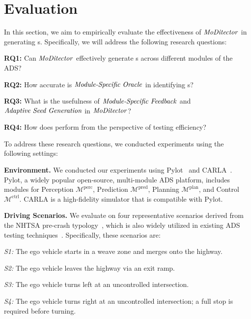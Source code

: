 \section{Evaluation}\label{sec: Evaluation}
In this section, we aim to empirically evaluate the effectiveness of \(\text{\textit{MoDitector}}\) in generating {\mccs}s. Specifically, we will address the following research questions:

\newcommand{\rqone}{Can \(\text{\tool}\) effectively generate {\mccs}s across different modules of the ADS?}
\newcommand{\rqtwo}{How accurate is \(\text{\oracle}\) in identifying {\mccs}s?}
\newcommand{\rqthree}{What is the usefulness of \(\text{\feedback}\) and \(\text{\select}\) in \(\text{\tool}\)?}
\newcommand{\rqfour}{How does \tool perform from the perspective of testing efficiency?}
\noindent \textbf{RQ1: } \rqone{}

\noindent \textbf{RQ2: } \rqtwo{}

\noindent \textbf{RQ3: } \rqthree{}

\noindent \textbf{RQ4: } \rqfour{}

To address these research questions, we conducted experiments using the following settings:

\textbf{Environment.} We conducted our experiments using Pylot~\cite{gog2021pylot} and CARLA~\cite{dosovitskiy2017carla}. Pylot, a widely popular open-source, multi-module ADS platform, includes modules for Perception $\mathcal{M}^{\text{perc}}$, Prediction $\mathcal{M}^{\text{pred}}$, Planning $\mathcal{M}^{\text{plan}}$, and Control $\mathcal{M}^{\text{ctrl}}$. CARLA is a high-fidelity simulator that is compatible with Pylot.

\textbf{Driving Scenarios.} 
We evaluate \tool on four representative scenarios derived from the NHTSA pre-crash typology~\cite{najm2007pre}, which is also widely utilized in existing ADS testing techniques~\cite{li2020av, cheng2023behavexplor}. Specifically, these scenarios are:

\noindent \textit{S1:} The ego vehicle starts in a weave zone and merges onto the highway.

\noindent \textit{S2:} The ego vehicle leaves the highway via an exit ramp.

\noindent \textit{S3:} The ego vehicle turns left at an uncontrolled intersection.

\noindent \textit{S4:} The ego vehicle turns right at an uncontrolled intersection; a full stop is required before turning.


